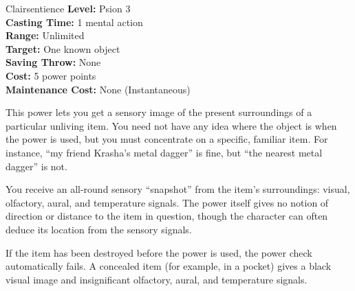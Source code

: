 {Clairsentience}
{
	\textbf{Level:}
	Psion 3\\
	\textbf{Casting Time:}
	1 mental action\\
	\textbf{Range:}
	Unlimited\\
	\textbf{Target:}
	One known object\\
	\textbf{Saving Throw:}
	None\\
	\textbf{Cost:}
	5 power points\\
	\textbf{Maintenance Cost:}
	None (Instantaneous)\\
}
{
	This power lets you get a sensory image of the present surroundings of a particular unliving item. You need not have any idea where the object is when the power is used, but you must concentrate on a specific, familiar item. For instance, ``my friend Krasha's metal dagger'' is fine, but ``the nearest metal dagger'' is not.

	You receive an all-round sensory ``snapshot'' from the item's surroundings: visual, olfactory, aural, and temperature signals. The power itself gives no notion of direction or distance to the item in question, though the character can often deduce its location from the sensory signals.

	If the item has been destroyed before the power is used, the power check automatically fails. A concealed item (for example, in a pocket) gives a black visual image and insignificant olfactory, aural, and temperature signals.
}